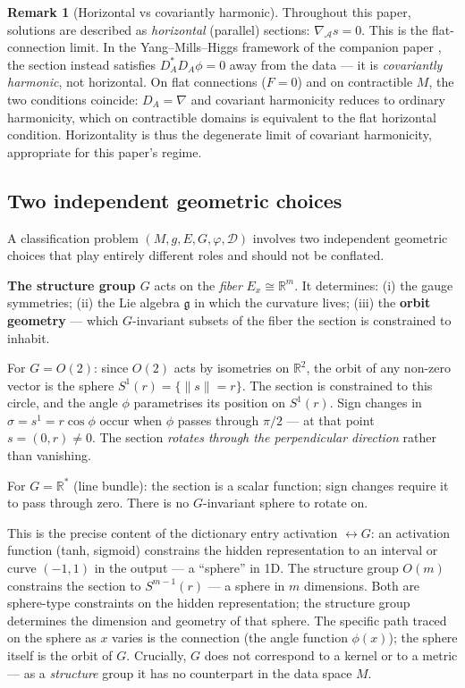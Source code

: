 \documentclass[11pt, a4paper]{article}
\theoremstyle{plain}
\theoremstyle{definition}
\newtheorem{remark}[theorem]{Remark}
\newcommand{\R}{\mathbb{R}}
\newcommand{\Sig}{\mathcal{A}}
\begin{document}
\begin{remark}[Horizontal vs covariantly harmonic]
Throughout this paper, solutions are described as \emph{horizontal} (parallel)
sections: $\nabla_\Sig s = 0$. This is the flat-connection limit. In the
Yang--Mills--Higgs framework of the companion paper \cite{Vasii2026Paper2},
the section instead satisfies $D_A^* D_A \phi = 0$ away from the data
--- it is \emph{covariantly harmonic}, not horizontal. On flat connections
($F = 0$) and on contractible $M$, the two conditions coincide: $D_A = \nabla$
and covariant harmonicity reduces to ordinary harmonicity, which on contractible
domains is equivalent to the flat horizontal condition. Horizontality
is thus the degenerate limit of covariant harmonicity, appropriate for this
paper's regime.
\end{remark}

\subsection{Two independent geometric choices}

A classification problem $(M, g, E, G, \varphi, \mathcal{D})$ involves two
independent geometric choices that play entirely different roles and should not
be conflated.

\textbf{The structure group $G$} acts on the \emph{fiber} $E_x \cong \R^m$. It
determines: (i) the gauge symmetries; (ii) the Lie algebra $\mathfrak{g}$ in which
the curvature lives; (iii) the \textbf{orbit geometry} --- which $G$-invariant
subsets of the fiber the section is constrained to inhabit.

For $G = O(2)$: since $O(2)$ acts by isometries on $\R^2$, the orbit of any
non-zero vector is the sphere $S^1(r) = \{\|s\| = r\}$. The section is constrained
to this circle, and the angle $\phi$ parametrises its position on $S^1(r)$. Sign
changes in $\sigma = s^1 = r\cos\phi$ occur when $\phi$ passes through $\pi/2$ ---
at that point $s = (0, r) \neq 0$. The section \emph{rotates through the
perpendicular direction} rather than vanishing.

For $G = \R^*$ (line bundle): the section is a scalar function; sign changes require
it to pass through zero. There is no $G$-invariant sphere to rotate on.

This is the precise content of the dictionary entry activation $\leftrightarrow G$:
an activation function (tanh, sigmoid) constrains the hidden representation to an
interval or curve $(-1,1)$ in the output --- a ``sphere'' in 1D. The structure group
$O(m)$ constrains the section to $S^{m-1}(r)$ --- a sphere in $m$ dimensions. Both
are sphere-type constraints on the hidden representation; the structure group
determines the dimension and geometry of that sphere. The specific path traced on
the sphere as $x$ varies is the connection (the angle function $\phi(x)$); the
sphere itself is the orbit of $G$. Crucially, $G$ does not correspond to a kernel
or to a metric --- as a \emph{structure} group it has no counterpart in the data
space $M$.
\end{document}
